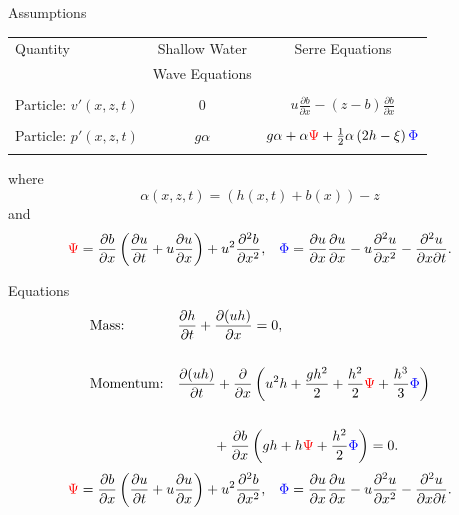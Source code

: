 \documentclass[]{beamer}
\begin{document}
\begin{frame}{Assumptions}
	\bigbreak
	 \pause 
	 \begin{tabular}{l | c | c}
	 	Quantity& Shallow Water & Serre Equations\\
	 	& Wave Equations &\\
	 	\hline && \\
	 	Particle: $v'(x,z,t)$& $0$ & $u\frac{\partial b}{\partial x} - (z - b)\frac{\partial b}{\partial x}$ \\ & & \\ \pause
	 	Particle: $p'(x,z,t)$& $g\alpha$ & $g\alpha + \alpha{ \color{red}\Psi } + \frac{1}{2} \alpha \left(2h - \xi\right) { \color{blue} \Phi }$ \\ & & \\ \hline
	 \end{tabular}
	 \bigbreak
	  where $$\alpha(x,z,t) = (h(x,t) + b(x)) - z$$ \pause
	 \bigskip
	  and
		\begin{align*}
		&{ \color{red}\Psi }  = \dfrac{\partial b}{\partial x}\left(\dfrac{\partial u}{\partial t} + u\dfrac{\partial u}{\partial x} \right)  + u^2\dfrac{\partial^2 b}{\partial x^2}, &
		{ \color{blue} \Phi }  = \dfrac{\partial u }{\partial x} \dfrac{\partial u}{\partial x} -u \dfrac{\partial^2 u}{\partial x^2}  - \dfrac{\partial^2 u}{\partial x \partial t} .
		\end{align*}
\end{frame}
\begin{frame}{Equations}
	\begin{subequations}
		\begin{align*}
		&\text{Mass:} && \frac{\partial h}{\partial t} + \dfrac{\partial (uh)}{\partial x} = 0,  \\ \\
		&\text{Momentum:} &&\dfrac{\partial (uh)}{\partial t} + \dfrac{\partial}{\partial x} \left ( u^2h + \dfrac{gh^2}{2} + \dfrac{h^2}{2}{ \color{red}\Psi } + \dfrac{h^3}{3}{ { \color{blue} \Phi } }  \right )   \\ \\& &&\quad \quad \; \; +  \dfrac{\partial b}{\partial x} \left (gh +   h { \color{red}\Psi } + \dfrac{h^2}{2}{ { \color{blue} \Phi } }  \right ) = 0.
		\end{align*}
	\end{subequations}
		\begin{align*}
		&{ \color{red}\Psi }  = \dfrac{\partial b}{\partial x}\left(\dfrac{\partial u}{\partial t} + u\dfrac{\partial u}{\partial x} \right)  + u^2\dfrac{\partial^2 b}{\partial x^2}, &
		{ \color{blue} \Phi }  = \dfrac{\partial u }{\partial x} \dfrac{\partial u}{\partial x} -u \dfrac{\partial^2 u}{\partial x^2}  - \dfrac{\partial^2 u}{\partial x \partial t} .
		\end{align*}
\end{frame}
\end{document}

